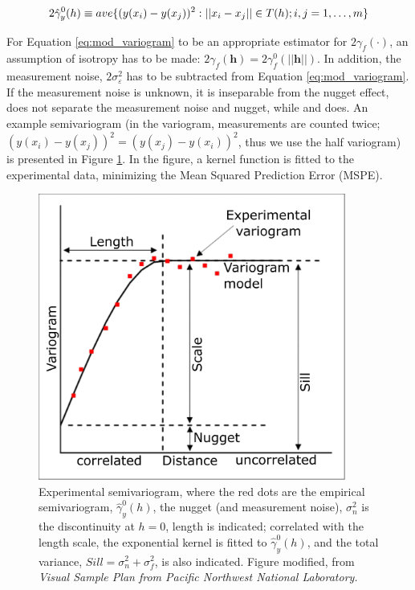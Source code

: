 \begin{align}
    \label{eq:mod_variogram}
    2\Hat{\gamma}_y^0 (h) \equiv ave\{(y(x_i)-y(x_j))^2:||x_i-x_j|| \in T(h);i,j=1,\ldots,m \}
\end{align}

For Equation \eqref{eq:mod_variogram} to be an appropriate estimator for $2\gamma_f(\cdot)$, an assumption of isotropy has to be made: $2\gamma_f(\mathbf{h}) = 2\gamma_f^0(||\mathbf{h}||)$. In addition, the measurement noise, $2\sigma_{\varepsilon}^2$ has to be subtracted from Equation \ref{eq:mod_variogram}. If the measurement noise is unknown, it is inseparable from the nugget effect, \textcite{rasmussen2003gaussian} does not separate the measurement noise and nugget, while \textcite{cressie2015statistics} and \textcite{eidsvik2015value} does. An example semivariogram (in the variogram, measurements are counted twice; $(y(x_i)-y(x_j))^2 = (y(x_j)-y(x_i))^2$, thus we use the half variogram) is presented in Figure \ref{fig:mod_variogram}. In the figure, a kernel function is fitted to the experimental data, minimizing the Mean Squared Prediction Error (MSPE). 

\begin{figure}
    \centering
    \includegraphics[width=0.9\textwidth]{figures/expvariogram.png}
    \caption{Experimental semivariogram, where the red dots are the empirical semivariogram, $\hat{\gamma}_y^0(h)$, the nugget (and measurement noise), $\sigma_n^2$ is the discontinuity at $h=0$, length is indicated; correlated with the length scale, the exponential kernel is fitted to $\hat{\gamma}_y^0(h)$, and the total variance, $Sill = \sigma_n^2 + \sigma_f^2$, is also indicated. Figure modified, from \textit{Visual Sample Plan from Pacific Northwest National Laboratory.}}
    \label{fig:mod_variogram}
\end{figure}

